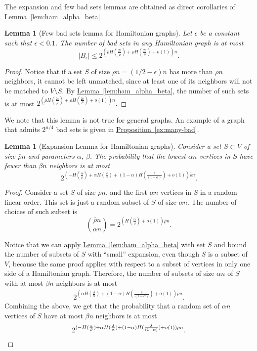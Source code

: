 \documentclass[11pt]{article}
\numberwithin{equation}{section}
\newtheorem{lemma}[theorem]{Lemma}
\theoremstyle{definition}
\theoremstyle{plain}
\newcommand{\expref}[2]{\hyperref[#2]{#1~\ref{#2}}}
\theoremstyle{plain}
\begin{document}
The expansion and few bad sets lemmas are obtained as direct corollaries of \expref{Lemma}{lem:ham_alpha_beta}.

%
\begin{lemma}[Few bad sets lemma for Hamiltonian graphs]
	Let $\epsilon$ be a constant such that $\epsilon<0.1$. The number of bad sets in any Hamiltonian graph is at most
	$$|B_\epsilon|\leq  2^{\left(\bar{\rho} H(\frac{2\epsilon}{\bar{\rho}})+\rho H(\frac{2\epsilon} {\rho})+o(1)\right)n}.$$ \label{lem:ham_bad_sets}
\end{lemma}
\begin{proof}
	Notice that if a set $S$ of size 
%
$\bar{\rho} n = (1/2-\epsilon)n$   %
has more than $\rho n$ neighbors, it cannot be left unmatched, since at least one of its neighbors will not be matched to $V\setminus S$. 
%
%
%
%
By \expref{Lemma}{lem:ham_alpha_beta}, the number of such sets is at most $2^{\left(\bar{\rho} H(\frac{2\epsilon}{\bar{\rho}})+\rho H(\frac{2\epsilon} {\rho})+o(1)\right)n}.$
\end{proof}

We note that this lemma is not true for general graphs.
An example of a graph that admits $2^{n/4}$ bad sets is given in \expref{Proposition}{ex:many-bad}.

\begin{lemma}[Expansion Lemma for Hamiltonian graphs]
	Consider a set $S\subset V$ of size $\bar{\rho} n$ and parameters $\alpha$, $\beta$. The probability that the lowest $\alpha n$ vertices in $S$ have
%
fewer  %
than $\beta n$ neighbors is at most
	$$2^{\left(-H(\frac{\alpha}{\bar{\rho}})+\alpha H(\frac{\delta}{ \alpha})+(1-\alpha)H(\frac{\delta} {(1-\alpha)})+o(1)\right)\bar{\rho}n}.$$   \label{lem:ham_expansion}	
\end{lemma}
\begin{proof}
	Consider a set $S$ of size $\bar{\rho} n$, and the first $\alpha n$ vertices in $S$ in a random linear order. This set is just a random subset of $S$ of size $\alpha n$. The number of choices of such subset is $$\binom{\bar{\rho}n}{\alpha n} = 2^{(H(\frac{\alpha}{\bar{\rho}})+o(1))\bar{\rho} n}.$$

Notice that we can apply \expref{Lemma}{lem:ham_alpha_beta} 
 with set $S$ and bound the number of subsets of $S$ with ``small'' expansion, 
%
%
%
%
even though $S$ is a subset of $V$, because the same proof applies
%
%
with respect to a subset of vertices in only %
one side of a Hamiltonian graph. Therefore, the number of subsets of size $\alpha n$ of $S$ with at most $\beta n$ neighbors is at most
	\begin{eqnarray*}
		2^{(\alpha H(\frac{\delta}{ \alpha})+(1-\alpha)H(\frac{\delta} {(1-\alpha)})+o(1))\bar{\rho}n}.
	\end{eqnarray*}
	Combining the above, we get that the probability that a random set of $\alpha n$ vertices of $S$ have at most $\beta n$ neighbors is at most
	\begin{eqnarray*}
2^{(-H(\frac{\alpha}{\bar{\rho}})+\alpha H(\frac{\delta}{ \alpha})+(1-\alpha)H(\frac{\delta} {(1-\alpha)})+o(1))\bar{\rho}n}.     \qedhere
	\end{eqnarray*}          
\end{proof}
\end{document}
